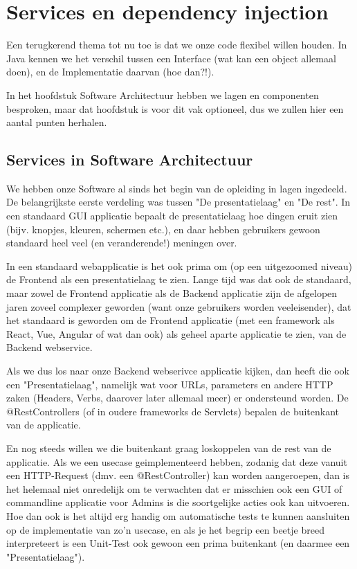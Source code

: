 \chapter{Services en dependency injection}

Een terugkerend thema tot nu toe is dat we onze code flexibel willen houden. In Java kennen we het 
verschil tussen een Interface (wat kan een object allemaal doen), en de Implementatie daarvan (hoe dan?!).

In het hoofdstuk Software Architectuur hebben we lagen en componenten besproken, maar dat hoofdstuk is
voor dit vak optioneel, dus we zullen hier een aantal punten herhalen. 

\section{Services in Software Architectuur}

We hebben onze Software al sinds het begin van de opleiding in lagen ingedeeld. 
De belangrijkste eerste verdeling was tussen "De presentatielaag" en "De rest". 
In een standaard GUI applicatie bepaalt de presentatielaag hoe dingen eruit zien 
(bijv. knopjes, kleuren, schermen etc.), en daar hebben gebruikers gewoon standaard heel veel
(en veranderende!) meningen over.

In een standaard webapplicatie is het ook prima om (op een uitgezoomed niveau) de Frontend als
een presentatielaag te zien. Lange tijd was dat ook de standaard, maar zowel de Frontend applicatie
als de Backend applicatie zijn de afgelopen jaren zoveel complexer geworden (want onze gebruikers worden
veeleisender), dat het standaard is geworden om de Frontend applicatie (met een framework als React, Vue, Angular
of wat dan ook) als geheel aparte applicatie te zien, van de Backend webservice.

Als we dus los naar onze Backend webserivce applicatie kijken, dan heeft die ook een "Presentatielaag", namelijk 
wat voor URLs, parameters en andere HTTP zaken (Headers, Verbs, daarover later allemaal meer) er ondersteund
worden. De @RestControllers (of in oudere frameworks de Servlets) bepalen de buitenkant van de applicatie.

En nog steeds willen we die buitenkant graag loskoppelen van de rest van de applicatie.
Als we een usecase geimplementeerd hebben, zodanig dat deze vanuit een HTTP-Request (dmv. een @RestController)
kan worden aangeroepen, dan is het helemaal niet onredelijk om te verwachten dat er misschien ook
een GUI of commandline applicatie voor Admins is die soortgelijke acties ook kan uitvoeren. Hoe dan ook
is het altijd erg handig om automatische tests te kunnen aansluiten op de implementatie van zo'n usecase, en
als je het begrip een beetje breed interpreteert is een Unit-Test ook gewoon een prima buitenkant (en daarmee
een "Presentatielaag").

